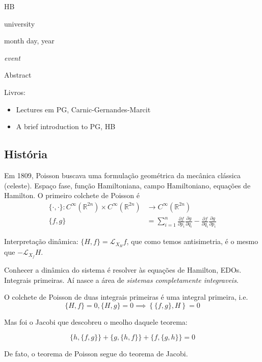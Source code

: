 \hfill{\Large HB}

{\Large \hfill university}

\hfill{\large month day, year

\hfill \textit{event}}
\vspace{2em}

\begin{thing6}{Abstract}

\end{thing6}
\vspace{2em}
Livros:
\begin{itemize}
\item Lectures em PG, Carnic-Gernandes-Marcit
\item A brief introduction to PG, HB
\end{itemize}

\subsection{História}

Em 1809, Poisson buscava uma formulação geométrica da mecânica clássica (celeste). Espaço fase, função Hamiltoniana, campo Hamiltoniano, equações de Hamilton. O primeiro colchete de Poisson é
\begin{align*}
	\{\cdot ,\cdot \}: C^\infty(\mathbb{R}^{2n})\times C^\infty(\mathbb{R}^{2n}) &\longrightarrow C^\infty(\mathbb{R}^{2n}) \\
	\{f,g\} &=\sum_{i=1}^n \frac{\partial f}{\partial p_i}\frac{\partial g}{\partial q_i}-\frac{\partial f}{\partial q_i}\frac{\partial g}{\partial p_i}
\end{align*}

Interpretação dinâmica: \(\{H,f\}=\mathcal{L}_{X_H}f\), que como temos antisimetria, é o mesmo que \(-\mathcal{L}_{X_f}H\).

Conhecer a dinâmica do sistema é resolver às equações de Hamilton, EDOs. Integrais primeiras. Aí nasce a área de \textit{sistemas completamente integraveis}.

\begin{thm}[de Poisson, 1809]\leavevmode
O colchete de Poisson de duas integrais primeiras é uma integral primeira, i.e.
\[\{H,f\}=0,\{H,g\}=0 \implies \left\{ \{f,g\},H \right\} =0\]
\end{thm}

Mas foi o Jacobi que descobreu o meolho daquele teorema:
\begin{thm}[Jacobi, 1842]\leavevmode
\[\{h,\{f,g\}\} +\{g,\{h,f\}\} +\{f,\{g,h\}\} =0\]
\end{thm}
De fato, o teorema de Poisson segue do teorema de Jacobi.

